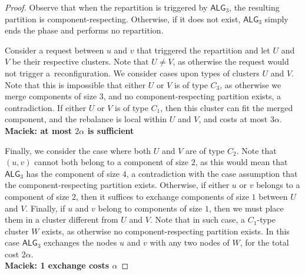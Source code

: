 \documentclass[manuscript,screen=true]{acmart}
\newcommand{\TAlg}{{\ensuremath{\textsf{ALG}_{3}}}\xspace} %
\newcommand\maciek[1]{\color{brown}\textbf{\\ Maciek: #1}\color{black}}
\begin{document}
\begin{proof}
  Observe that when the repartition is triggered by \TAlg, the resulting partition is component-respecting.
  Otherwise, if it does not exist, \TAlg simply ends the phase and performs no repartition.

  
    Consider a request between $u$ and $v$ that triggered the repartition and let $U$ and $V$ be their respective clusters.
    Note that $U\neq V$, as otherwise the request would not trigger a~reconfiguration.
    We consider cases upon types of clusters $U$ and $V$.
    Note that this is impossible that either $U$ or $V$ is of type $C_3$, as otherwise we merge components of size $3$, and no component-respecting partition exists, a contradiction.
    If either $U$ or $V$ is of type $C_1$, then this cluster can fit the merged component, and the rebalance is local within $U$ and $V$, and costs at most $3\alpha$.
    \maciek{at most $2\alpha$ is sufficient}
  
    Finally, we consider the case where both $U$ and $V$ are of type $C_2$. Note that $(u,v)$ cannot both belong to a component of size $2$, as this would mean that \TAlg has the component of size $4$, a contradiction with the case assumption that the component-respecting partition exists. 
    Otherwise, if either $u$ or $v$ belongs to a component of size $2$, then it suffices to exchange components of size $1$ between $U$ and $V$.
    Finally, if $u$ and $v$ belong to components of size $1$, then we must place them in a cluster different from $U$ and $V$.
    Note that in such case, a $C_1$-type cluster $W$ exists, as otherwise no component-respecting partition exists. In this case \TAlg exchanges the nodes $u$ and $v$ with any two nodes of $W$, for the total cost $2\alpha$.
    \maciek{1 exchange costs $\alpha$}
\end{proof}
\end{document}
